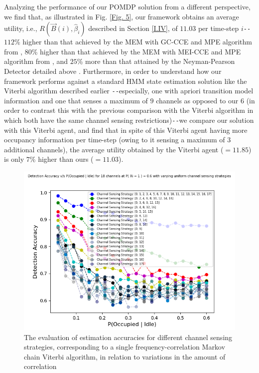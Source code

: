 Analyzing the performance of our POMDP solution from a different perspective, we find that, as illustrated in Fig. \ref{Fig. 5}, our framework obtains an average utility, i.e., $R(\vec{B}(i),\hat{\beta}_{i})$ described in Section \ref{I.IV}, of $11.03$ per time-step $i$\texttt{-{}-} $112$\% higher than that achieved by the MEM with GC-CCE and MPE algorithm from \cite{WCL:7}, $80$\% higher than that achieved by the MEM with MEI-CCE and MPE algorithm from \cite{WCL:7}, and $25$\% more than that attained by the Neyman-Pearson Detector detailed above \cite{WCL:11}. Furthermore, in order to understand how our framework performs against a standard HMM state estimation solution like the Viterbi algorithm described earlier \cite{WCL:6}\texttt{-{}-}especially, one with apriori transition model information and one that senses a maximum of $9$ channels as opposed to our $6$ (in order to contrast this with the previous comparison with the Viterbi algorithm in which both have the same channel sensing restrictions)\texttt{-{}-}we compare our solution with this Viterbi agent, and find that in spite of this Viterbi agent having more occupancy information per time-step (owing to it sensing a maximum of $3$ additional channels), the average utility obtained by the Viterbi agent (${=}11.85$) is only $7$\% higher than ours (${=}11.03$).
\begin{figure} [htb]
    \centerline{
    \includegraphics[width = 1.0\textwidth]{Uniform_Channel_Sensing.png}}
    \caption{The evaluation of estimation accuracies for different channel sensing strategies, corresponding to a single frequency-correlation Markov chain Viterbi algorithm, in relation to variations in the amount of correlation}
    \label{Fig. 6}
\end{figure}

